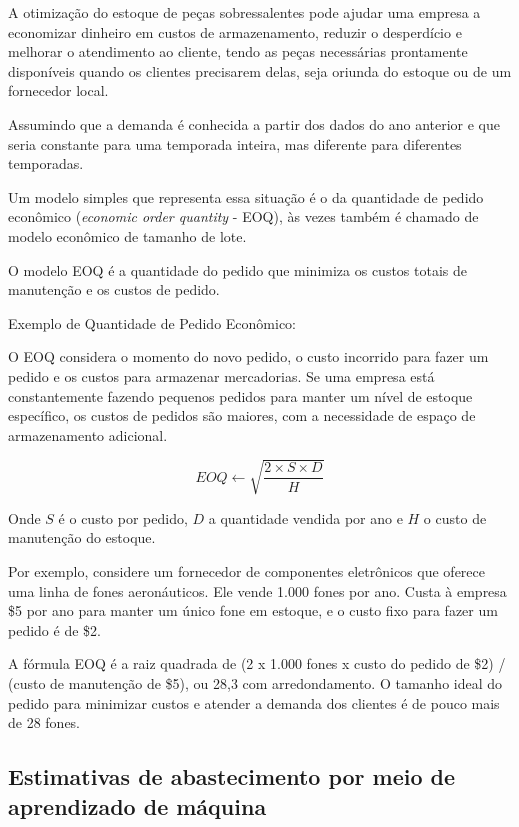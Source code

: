 \documentclass{amsart}
\begin{document}
A otimização do estoque de peças sobressalentes pode ajudar uma empresa a economizar dinheiro em custos de armazenamento, reduzir o desperdício e melhorar o atendimento ao cliente, tendo as peças necessárias prontamente disponíveis quando os clientes precisarem delas, seja oriunda do estoque ou de um fornecedor local.

Assumindo que a demanda é conhecida a partir dos dados do ano anterior e que seria constante para uma temporada inteira, mas diferente para diferentes temporadas.

Um modelo simples que representa essa situação é o da quantidade de pedido econômico ({\it economic order quantity} - EOQ), às vezes também é chamado de modelo econômico de tamanho de lote.

O modelo EOQ é a quantidade do pedido que minimiza os custos totais de manutenção e os custos de pedido.

Exemplo de Quantidade de Pedido Econômico:

O EOQ considera o momento do novo pedido, o custo incorrido para fazer um pedido e os custos para armazenar mercadorias. Se uma empresa está constantemente fazendo pequenos pedidos para manter um nível de estoque específico, os custos de pedidos são maiores, com a necessidade de espaço de armazenamento adicional.

\begin{equation} \label{eq:eoq}
	EOQ \gets \sqrt{\frac{2 \times S \times D}{H}}
\end{equation}

Onde $S$ é o custo por pedido, $D$ a quantidade vendida por ano e $H$ o custo de manutenção do estoque.

Por exemplo, considere um fornecedor de componentes eletrônicos que oferece uma linha de fones aeronáuticos. Ele vende 1.000 fones por ano. Custa à empresa \$5 por ano para manter um único fone em estoque, e o custo fixo para fazer um pedido é de \$2.

A fórmula EOQ é a raiz quadrada de (2 x 1.000 fones x custo do pedido de \$2) / (custo de manutenção de \$5), ou 28,3 com arredondamento. O tamanho ideal do pedido para minimizar custos e atender a demanda dos clientes é de pouco mais de 28 fones.

\subsection{Estimativas de abastecimento por meio de aprendizado de máquina}\
\end{document}
